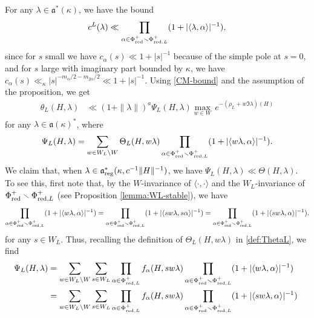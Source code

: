 \documentclass[12pt]{amsart}
\theoremstyle{remark}
\begin{document}
For any $\lambda\in\mathfrak{a}^*(\kappa)$, we have the bound
\begin{equation}\label{CM-bound}
c^L(\lambda)\ll \prod_{\alpha\in\Phi^+_{\textnormal{red}}\smallsetminus\Phi_{\textnormal{red},L}^+} (1+|\langle \lambda,\alpha\rangle|^{-1}),
\end{equation}
since for $s$ small we have $c_{\alpha}(s) \ll 1 + |s|^{-1}$ because of the simple pole at $s = 0$, and for $s$ large with imaginary part bounded by $\kappa$, we have $c_{\alpha}(s) \ll_\kappa |s|^{-m_{\alpha}/2 - m_{2 \alpha}/2} \ll 1 + |s|^{-1}$. Using \eqref{CM-bound} and the assumption of the proposition, we get
\begin{align*}
\theta_L(H, \lambda)&\ll (1 +\|\lambda\|)^a \Psi_L(H,\lambda) \underset{w \in W}{\max} \, e^{-(\rho_L + w \Im \lambda)(H)}
\end{align*}
for any $\lambda\in\mathfrak{a}(\kappa)^*$, where
\begin{align*}
\Psi_L(H,\lambda)=\sum_{w\in W_L\backslash W}\Theta_L(H, w\lambda)\prod_{\alpha\in\Phi_{\textnormal{red}}^+\smallsetminus\Phi_{\textnormal{red},L}^+} (1+|\langle w\lambda,\alpha\rangle|^{-1}).
\end{align*}
We claim that, when $\lambda\in\mathfrak{a}_{\rm reg}^* (\kappa, c^{-1} \|H\|^{-1})$, we have $\Psi_L(H,\lambda)\ll \Theta(H,\lambda)$. To see this, first note that, by the $W$-invariance of $\langle\cdot,\cdot\rangle$ and the $W_L$-invariance of $\Phi_{\textnormal{red}}^+\smallsetminus\Phi_{\textnormal{red},L}^+$ (see Proposition \ref{lemma:WL-stable}),  we have 
\[
\prod_{\alpha \in \Phi_{\textnormal{red}}^+\smallsetminus\Phi_{\textnormal{red},L}^+} (1+|\langle w\lambda,\alpha\rangle|^{-1})=\prod_{\alpha \in \Phi_{\textnormal{red}}^+\smallsetminus\Phi_{\textnormal{red},L}^+} (1+|\langle sw\lambda, s\alpha\rangle|^{-1})=\prod_{\alpha \in \Phi_{\textnormal{red}}^+\smallsetminus\Phi_{\textnormal{red},L}^+} (1+|\langle sw\lambda, \alpha\rangle|^{-1}).
\]
for any $s\in W_L$. Thus, recalling the definition of $\Theta_L(H, w\lambda)$ in \eqref{def:ThetaL}, we find
\begin{align*}
\Psi_L(H,\lambda)&=\sum_{w\in W_L\backslash W}\sum_{s\in W_L}\prod_{\alpha\in\Phi_{\textnormal{red},L}^+}f_\alpha(H,sw\lambda)\prod_{\alpha \in \Phi_{\textnormal{red}}^+\smallsetminus\Phi_{\textnormal{red},L}^+} (1+|\langle w\lambda,\alpha\rangle|^{-1})\\
&=\sum_{w\in W_L\backslash W}\sum_{s\in W_L}\prod_{\alpha \in \Phi_{\textnormal{red},L}^+}f_\alpha(H,sw\lambda)\prod_{\alpha \in \Phi_{\textnormal{red}}^+\smallsetminus\Phi_{\textnormal{red},L}^+}(1+|\langle sw\lambda,\alpha\rangle|^{-1})\
\end{align*}
\end{document}
